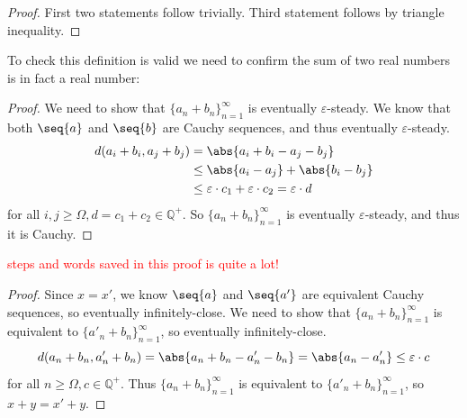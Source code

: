 {
\begin{proof}
    First two statements follow trivially. Third statement follows by triangle inequality. 
\end{proof}


To check this definition is valid we need to confirm the sum of two real numbers is in fact a real number:

\begin{proof}
    We need to show that $\{a_n+b_n\}_{n=1}^{\infty}$ is eventually $\varepsilon$-steady. We know that both $\seq{a}$ and $\seq{b}$ are Cauchy sequences, and thus eventually $\varepsilon$-steady.
    \begin{align*}
        d(a_i+b_i, a_j+b_j)&=\abs{a_i+b_i - a_j -b_j} \\
        & \leq \abs{a_i-a_j} + \abs{b_i - b_j} \\
        & \leq \varepsilon \cdot c_1 + \varepsilon \cdot c_2 = \varepsilon \cdot d
    \end{align*}
    for all $i,j \geq \Omega, d=c_1+c_2 \in \mathbb{Q}^+$. So $\{a_n+b_n\}_{n=1}^{\infty}$ is eventually $\varepsilon$-steady, and thus it is Cauchy.
\end{proof}
\textcolor{red}{steps and words saved in this proof is quite a lot!}

\begin{proof}
    Since $x=x'$, we know $\seq{a}$ and $\seq{a'}$ are equivalent Cauchy sequences, so eventually infinitely-close. We need to show that $\{a_n+b_n\}_{n=1}^{\infty}$ is equivalent to $\{a'_n+b_n\}_{n=1}^{\infty}$, so eventually infinitely-close. 
    \begin{equation*}
        d(a_n+b_n, a'_n+b_n)= \abs{a_n+b_n - a'_n-b_n} = \abs{a_n - a'_n} \leq \varepsilon \cdot c
    \end{equation*}
    for all $n \geq \Omega, c \in \mathbb{Q}^+$. Thus $\{a_n+b_n\}_{n=1}^{\infty}$ is equivalent to $\{a'_n+b_n\}_{n=1}^{\infty}$, so $x+y=x'+y$.
\end{proof}

}
